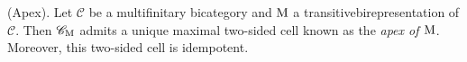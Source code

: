 
\noindent\begin{lemmadefinition}\textup{(Apex).}\label{Apex} Let $\mathscr{C}$ be a multifinitary bicategory and $\textup{M}$ a transitive\linebreak birepresentation of $\mathscr{C}$. Then $\mathscr{C}_\textup{M}$ admits a unique maximal two-sided cell known as the {\em apex of $\textup{M}$}. Moreover, this two-sided cell is idempotent.\\
\end{lemmadefinition}

